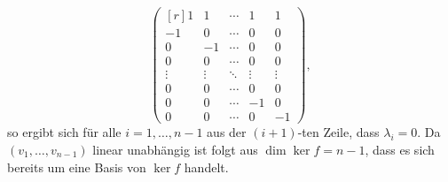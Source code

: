 \begin{solution}
 \[
  \begin{pmatrix*}[r]
    1     &  1     & \cdots &  1     &  1     \\
   -1     &  0     & \cdots &  0     &  0     \\
    0     & -1     & \cdots &  0     &  0     \\
    0     &  0     & \cdots &  0     &  0     \\
   \vdots & \vdots & \ddots & \vdots & \vdots \\
    0     &  0     & \cdots &  0     &  0     \\
    0     &  0     & \cdots & -1     &  0     \\
    0     &  0     & \cdots &  0     & -1
  \end{pmatrix*},
 \]
 so ergibt sich für alle $i=1, \dotsc, n-1$ aus der $(i+1)$-ten Zeile, dass $\lambda_i = 0$. Da $(v_1, \dotsc, v_{n-1})$ linear unabhängig ist folgt aus $\dim \ker f = n-1$, dass es sich bereits um eine Basis von $\ker f$ handelt.
\end{solution}


